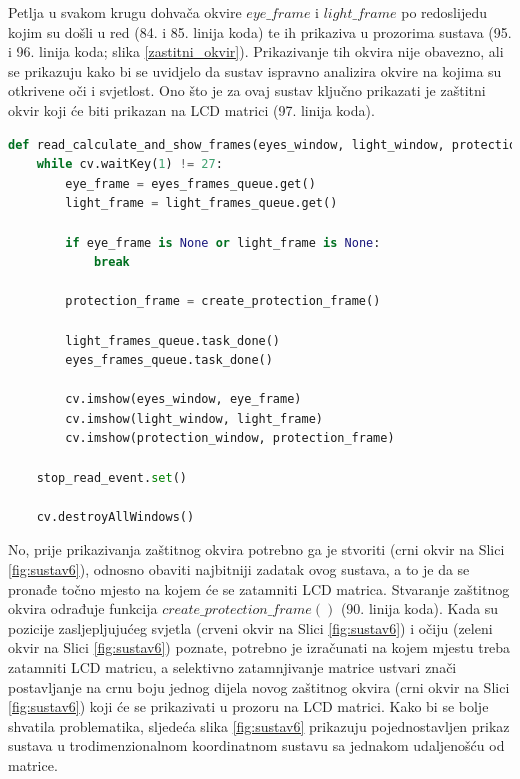 \documentclass{foi}
\begin{document}
Petlja u svakom krugu dohvača okvire $eye\_frame$ i $light\_frame$ po redoslijedu kojim su došli u red (84. i 85. linija koda) te ih prikaziva u prozorima sustava (95. i 96. linija koda; slika \ref{zastitni_okvir}). Prikazivanje tih okvira nije obavezno, ali se prikazuju kako bi se uvidjelo da sustav ispravno analizira okvire na kojima su otkrivene oči i svjetlost. Ono što je za ovaj sustav ključno prikazati je zaštitni okvir koji će biti prikazan na LCD matrici (97. linija koda).

\begin{lstlisting}[language=Python, label={lst:lstlisting_11}, firstnumber=82, style=colored, caption={Definicija funkcije $read\_calculate\_and\_show\_frames()$}]
def read_calculate_and_show_frames(eyes_window, light_window, protection_window):
    while cv.waitKey(1) != 27:
        eye_frame = eyes_frames_queue.get()
        light_frame = light_frames_queue.get()

        if eye_frame is None or light_frame is None:
            break

        protection_frame = create_protection_frame()

        light_frames_queue.task_done()
        eyes_frames_queue.task_done()

        cv.imshow(eyes_window, eye_frame)
        cv.imshow(light_window, light_frame)
        cv.imshow(protection_window, protection_frame)

    stop_read_event.set()

    cv.destroyAllWindows()
\end{lstlisting}

No, prije prikazivanja zaštitnog okvira potrebno ga je stvoriti (crni okvir na Slici \ref{fig:sustav6}), odnosno obaviti najbitniji zadatak ovog sustava, a to je da se pronađe točno mjesto na kojem će se zatamniti LCD matrica. Stvaranje zaštitnog okvira odrađuje funkcija $create\_protection\_frame()$ (90. linija koda). Kada su pozicije zasljepljujućeg svjetla (crveni okvir na Slici \ref{fig:sustav6}) i očiju (zeleni okvir na Slici \ref{fig:sustav6}) poznate, potrebno je izračunati na kojem mjestu treba zatamniti LCD matricu, a selektivno zatamnjivanje matrice ustvari znači postavljanje na crnu boju jednog dijela novog zaštitnog okvira (crni okvir na Slici \ref{fig:sustav6}) koji će se prikazivati u prozoru na LCD matrici. Kako bi se bolje shvatila problematika, sljedeća slika \ref{fig:sustav6} prikazuju pojednostavljen prikaz sustava u trodimenzionalnom koordinatnom sustavu sa jednakom udaljenošću od matrice.
\end{document}
